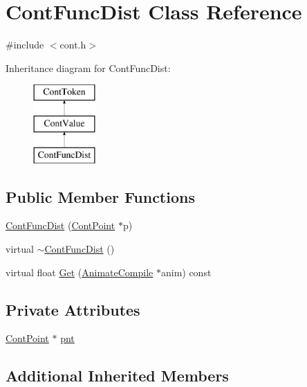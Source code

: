 \hypertarget{a00054}{\section{Cont\-Func\-Dist Class Reference}
\label{a00054}
}


{\ttfamily \#include $<$cont.\-h$>$}

Inheritance diagram for Cont\-Func\-Dist\-:\begin{figure}[H]
\begin{center}
\leavevmode
\includegraphics[height=3.000000cm]{a00054}
\end{center}
\end{figure}
\subsection*{Public Member Functions}
\begin{DoxyCompactItemize}
\item 
\hyperlink{a00054_a97706d170a756b8562306a1093b12254}{Cont\-Func\-Dist} (\hyperlink{a00062}{Cont\-Point} $\ast$p)
\item 
virtual \hyperlink{a00054_a1cb1e8eb3fffedcf8eed9c4e34a5718b}{$\sim$\-Cont\-Func\-Dist} ()
\item 
virtual float \hyperlink{a00054_aa331b7ff493f29881399cdc476219d5b}{Get} (\hyperlink{a00007}{Animate\-Compile} $\ast$anim) const 
\end{DoxyCompactItemize}
\subsection*{Private Attributes}
\begin{DoxyCompactItemize}
\item 
\hyperlink{a00062}{Cont\-Point} $\ast$ \hyperlink{a00054_a16341c9754535537ff04e6dc557b1d48}{pnt}
\end{DoxyCompactItemize}
\subsection*{Additional Inherited Members}


